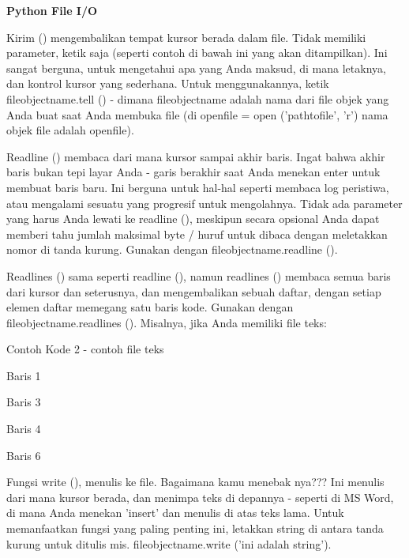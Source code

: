 \begin{center}{\fontsize{24pt}{24pt}\selectfont \textbf{Python File I/O} \\}
\vspace{12pt}

Kirim () mengembalikan tempat kursor berada dalam file. Tidak memiliki parameter, ketik saja (seperti contoh di bawah ini yang akan ditampilkan). Ini sangat berguna, untuk mengetahui apa yang Anda maksud, di mana letaknya, dan kontrol kursor yang sederhana. Untuk menggunakannya, ketik fileobjectname.tell () - dimana fileobjectname adalah nama dari file objek yang Anda buat saat Anda membuka file (di openfile = open ('pathtofile', 'r') nama objek file adalah openfile). 

\vspace{12pt}
 
Readline () membaca dari mana kursor sampai akhir baris. Ingat bahwa akhir baris bukan tepi layar Anda - garis berakhir saat Anda menekan enter untuk membuat baris baru. Ini berguna untuk hal-hal seperti membaca log peristiwa, atau mengalami sesuatu yang progresif untuk mengolahnya. Tidak ada parameter yang harus Anda lewati ke readline (), meskipun secara opsional Anda dapat memberi tahu jumlah maksimal byte / huruf untuk dibaca dengan meletakkan nomor di tanda kurung. Gunakan dengan fileobjectname.readline (). 

\vspace{12pt}

Readlines () sama seperti readline (), namun readlines () membaca semua baris dari kursor dan seterusnya, dan mengembalikan sebuah daftar, dengan setiap elemen daftar memegang satu baris kode. Gunakan dengan fileobjectname.readlines (). Misalnya, jika Anda memiliki file teks: 

Contoh Kode 2 - contoh file teks 

\vspace{12pt}
 
Baris 1 

\vspace{12pt}

Baris 3

Baris 4 

\vspace{12pt}

Baris 6 
\vspace{14pt}

Fungsi write (), menulis ke file. Bagaimana kamu menebak nya??? Ini menulis dari mana kursor berada, dan menimpa teks di depannya - seperti di MS Word, di mana Anda menekan 'insert' dan menulis di atas teks lama. Untuk memanfaatkan fungsi yang paling penting ini, letakkan string di antara tanda kurung untuk ditulis mis. fileobjectname.write ('ini adalah string'). 


\end{center}
